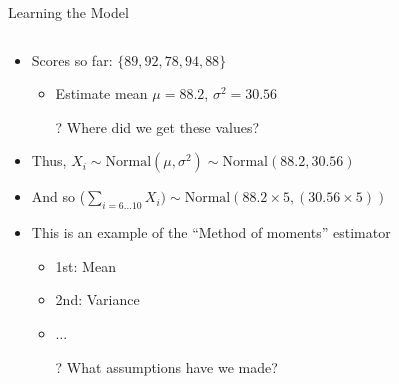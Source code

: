 \documentclass[aspectratio=169]{beamer}
\begin{document}
\begin{frame}{Learning the Model}

\begin{columns}[c]
\begin{column}{0.7\textwidth}
\begin{itemize}
	\item Scores so far: $\{89, 92, 78, 94, 88\}$
	\begin{itemize}
	\item Estimate mean $\mu = 88.2$, $\sigma^2 = 30.56$
	\item[?] Where did we get these values? %
\end{itemize}
	\item Thus, $X_i \sim \textrm{Normal} (\mu, \sigma^2) \sim \textrm{Normal}(88.2, 30.56)$
	\item And so ($\sum_{i=6...10} X_i) \sim \textrm{Normal} (88.2 \times 5, (30.56 \times 5))$
	\item This is an example of the ``Method of moments'' estimator
\begin{itemize}
	\item 1st: Mean
	\item 2nd: Variance
	\item $\ldots$ %
	\item[?] What assumptions have we made? %
	\end{itemize}
\end{itemize}
\end{column}
\begin{column}{0.3\textwidth}

\end{column}
\end{columns}
\end{frame}
\end{document}

